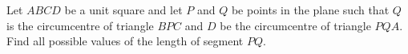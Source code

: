 Let $ABCD$ be a unit square and let $P$ and $Q$ be points in the plane such that $Q$ is the circumcentre of triangle $BPC$ and $D$ be the circumcentre of triangle $PQA$. Find all possible values of the length of segment $PQ$.